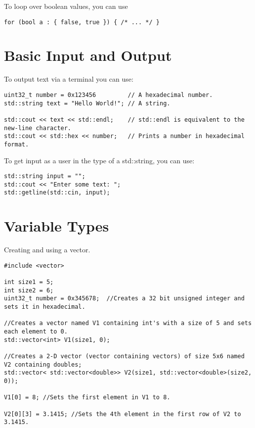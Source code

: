To loop over boolean values, you can use
\begin{lstlisting}
for (bool a : { false, true }) { /* ... */ }
\end{lstlisting}



\section{Basic Input and Output}
To output text via a terminal you can use:
\begin{lstlisting}
uint32_t number = 0x123456         // A hexadecimal number.
std::string text = "Hello World!"; // A string.

std::cout << text << std::endl;    // std::endl is equivalent to the new-line character.
std::cout << std::hex << number;   // Prints a number in hexadecimal format.
\end{lstlisting}

To get input as a user in the type of a std::string, you can use:
\begin{lstlisting}
std::string input = "";
std::cout << "Enter some text: ";
std::getline(std::cin, input);
\end{lstlisting}






\section{Variable Types}

Creating and using a vector.
\begin{lstlisting}
#include <vector>

int size1 = 5;
int size2 = 6;
uint32_t number = 0x345678;  //Creates a 32 bit unsigned integer and sets it in hexadecimal.

//Creates a vector named V1 containing int's with a size of 5 and sets each element to 0. 
std::vector<int> V1(size1, 0); 

//Creates a 2-D vector (vector containing vectors) of size 5x6 named V2 containing doubles;
std::vector< std::vector<double>> V2(size1, std::vector<double>(size2, 0)); 

V1[0] = 8; //Sets the first element in V1 to 8.

V2[0][3] = 3.1415; //Sets the 4th element in the first row of V2 to 3.1415.
\end{lstlisting}







